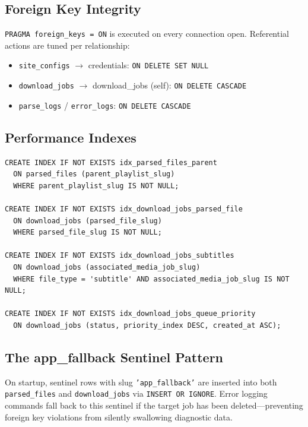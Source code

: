 \documentclass[10pt,letterpaper]{article}
\begin{document}
\subsection{Foreign Key Integrity}

\texttt{PRAGMA foreign\_keys = ON} is executed on every connection open. Referential
actions are tuned per relationship:

\begin{itemize}[leftmargin=1.6em, itemsep=2pt]
  \item \texttt{site\_configs} $\to$ credentials: \texttt{ON DELETE SET NULL}
  \item \texttt{download\_jobs} $\to$ download\_jobs (self): \texttt{ON DELETE CASCADE}
  \item \texttt{parse\_logs} / \texttt{error\_logs}: \texttt{ON DELETE CASCADE}
\end{itemize}

\subsection{Performance Indexes}

\begin{lstlisting}[caption={Partial indexes (lib.rs)}]
CREATE INDEX IF NOT EXISTS idx_parsed_files_parent
  ON parsed_files (parent_playlist_slug)
  WHERE parent_playlist_slug IS NOT NULL;

CREATE INDEX IF NOT EXISTS idx_download_jobs_parsed_file
  ON download_jobs (parsed_file_slug)
  WHERE parsed_file_slug IS NOT NULL;

CREATE INDEX IF NOT EXISTS idx_download_jobs_subtitles
  ON download_jobs (associated_media_job_slug)
  WHERE file_type = 'subtitle' AND associated_media_job_slug IS NOT NULL;

CREATE INDEX IF NOT EXISTS idx_download_jobs_queue_priority
  ON download_jobs (status, priority_index DESC, created_at ASC);
\end{lstlisting}

\subsection{The app\_fallback Sentinel Pattern}

On startup, sentinel rows with slug \texttt{'app\_fallback'} are inserted into both
\texttt{parsed\_files} and \texttt{download\_jobs} via \texttt{INSERT OR IGNORE}. Error
logging commands fall back to this sentinel if the target job has been deleted---preventing
foreign key violations from silently swallowing diagnostic data.
\end{document}
